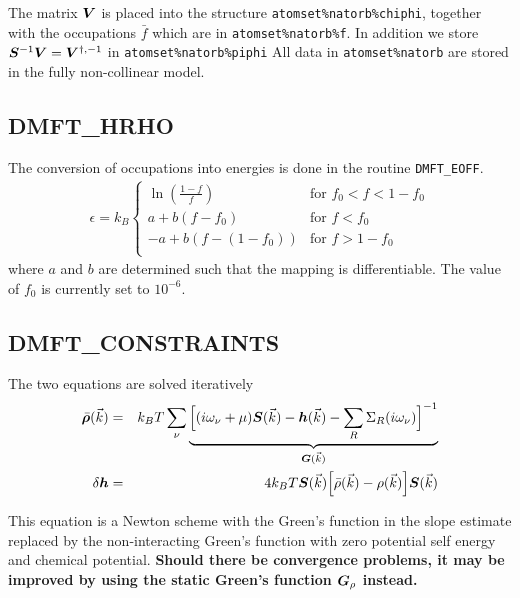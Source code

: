 \documentclass[11pt,a4paper]{report}
\begin{document}
The matrix $\bm{V}$ is placed into the structure
\verb|atomset%natorb%chiphi|, together with the occupations $\bar{f}$
which are in \verb|atomset%natorb%f|. In addition we store
$\bm{S}^{-1}\bm{V}=\bm{V}^{\dagger,-1}$ in
\verb|atomset%natorb%piphi| All data in \verb|atomset%natorb| are
stored in the fully non-collinear model.

\subsection{DMFT\_HRHO}
The conversion of occupations into energies is done in the routine
\verb|DMFT_EOFF|.
\begin{eqnarray}
\epsilon=k_B
\begin{cases}
\ln\left(\frac{1-f}{f}\right) &\text{for $f_0<f<1-f_0$}\\
a+b(f-f_0)&\text{for $f<f_0$}\\
-a+b(f-(1-f_0))&\text{for $f>1-f_0$}\\
\end{cases}
\end{eqnarray}
where $a$ and $b$ are determined such that the mapping is
differentiable. The value of $f_0$ is currently set to $10^{-6}$.

\subsection{DMFT\_CONSTRAINTS}
The two equations are solved iteratively
\begin{eqnarray}
\bar{\bm{\rho}}(\vec{k})&=&k_BT\sum_\nu
\underbrace{\Bigl[
(i\omega_\nu+\mu)\bm{S}(\vec{k})-\bm{h}(\vec{k})-\sum_R \Sigma_R(i\omega_\nu)
\Bigr]^{-1}}_{\bm{G}(\vec{k})}
\\
\delta\bm{h}&=&4k_BT\bm{S}(\vec{k})\Bigl[
\bar{\rho}(\vec{k})-\rho(\vec{k})\Bigr]
\bm{S}(\vec{k})
\end{eqnarray}

This equation is a Newton scheme with the Green's function in the
slope estimate replaced by the non-interacting Green's function with
zero potential self energy and chemical potential. \textbf{Should
  there be convergence problems, it may be improved by using the
  static Green's function $\bm{G}_\rho$ instead.}
\end{document}
